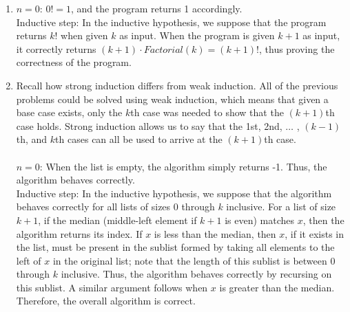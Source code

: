 \documentclass{article}
\begin{document}
\begin{enumerate}
\item $n = 0$: $0! = 1$, and the program returns 1 accordingly.\\
Inductive step: In the inductive hypothesis, we suppose that the program returns $k!$ when given $k$ as input. When the program is given $k + 1$ as input, it correctly returns $(k + 1) \cdot Factorial(k) = (k + 1)!$, thus proving the correctness of the program.

\item Recall how strong induction differs from weak induction. All of the previous problems could be solved using weak induction, which means that given a base case exists, only the $k$th case was needed to show that the $(k + 1)$th case holds. Strong induction allows us to say that the 1st, 2nd, $\ldots$ , $(k - 1)$th, and $k$th cases can all be used to arrive at the $(k + 1)$th case.\\\\
$n = 0$: When the list is empty, the algorithm simply returns -1. Thus, the algorithm behaves correctly.\\
Inductive step: In the inductive hypothesis, we suppose that the algorithm behaves correctly for all lists of sizes 0 through $k$ inclusive. For a list of size $k + 1$, if the median (middle-left element if $k + 1$ is even) matches $x$, then the algorithm returns its index. If $x$ is less than the median, then $x$, if it exists in the list, must be present in the sublist formed by taking all elements to the left of $x$ in the original list; note that the length of this sublist is between 0 through $k$ inclusive. Thus, the algorithm behaves correctly by
recursing on this sublist. A similar argument follows when $x$ is greater than the median. Therefore, the overall algorithm is correct.

\end{enumerate}
\end{document}

